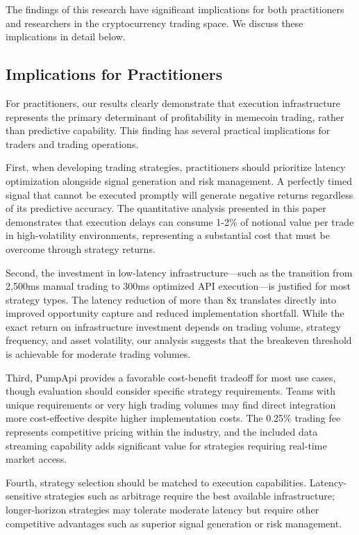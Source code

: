 \documentclass[12pt,a4paper]{article}
\begin{document}
The findings of this research have significant implications for both practitioners and researchers in the cryptocurrency trading space. We discuss these implications in detail below.

\subsection{Implications for Practitioners}

For practitioners, our results clearly demonstrate that execution infrastructure represents the primary determinant of profitability in memecoin trading, rather than predictive capability. This finding has several practical implications for traders and trading operations.

First, when developing trading strategies, practitioners should prioritize latency optimization alongside signal generation and risk management. A perfectly timed signal that cannot be executed promptly will generate negative returns regardless of its predictive accuracy. The quantitative analysis presented in this paper demonstrates that execution delays can consume 1-2\% of notional value per trade in high-volatility environments, representing a substantial cost that must be overcome through strategy returns.

Second, the investment in low-latency infrastructure—such as the transition from 2,500ms manual trading to 300ms optimized API execution—is justified for most strategy types. The latency reduction of more than 8x translates directly into improved opportunity capture and reduced implementation shortfall. While the exact return on infrastructure investment depends on trading volume, strategy frequency, and asset volatility, our analysis suggests that the breakeven threshold is achievable for moderate trading volumes.

Third, PumpApi provides a favorable cost-benefit tradeoff for most use cases, though evaluation should consider specific strategy requirements. Teams with unique requirements or very high trading volumes may find direct integration more cost-effective despite higher implementation costs. The 0.25\% trading fee represents competitive pricing within the industry, and the included data streaming capability adds significant value for strategies requiring real-time market access.

Fourth, strategy selection should be matched to execution capabilities. Latency-sensitive strategies such as arbitrage require the best available infrastructure; longer-horizon strategies may tolerate moderate latency but require other competitive advantages such as superior signal generation or risk management.
\end{document}

